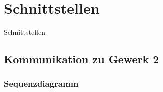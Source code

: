 
\chapter{Schnittstellen}
\label{sec:Schnittstellen}

Schnittstellen

\section{Kommunikation zu Gewerk 2}
\label{sec:}

\subsection{Sequenzdiagramm}
\label{sec:sequenzdiagram}


